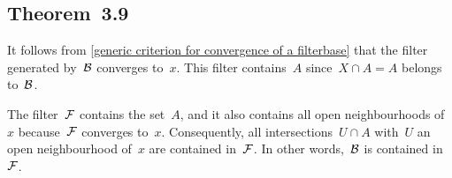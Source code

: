 \subsection{Theorem~3.9}

It follows from \cref{generic criterion for convergence of a filterbase} that the filter generated by~$\mathcal{B}$ converges to~$x$.
This filter contains~$A$ since~$X ∩ A = A$ belongs to~$\mathcal{B}$.

The filter~$\mathcal{F}$ contains the set~$A$, and it also contains all open neighbourhoods of~$x$ because~$\mathcal{F}$ converges to~$x$.
Consequently, all intersections~$U ∩ A$ with~$U$ an open neighbourhood of~$x$ are contained in~$\mathcal{F}$.
In other words,~$\mathcal{B}$ is contained in~$\mathcal{F}$.

